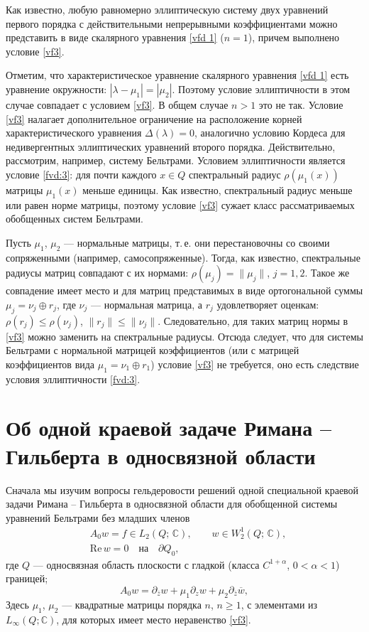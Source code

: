 Как известно, любую равномерно эллиптическую систему двух уравнений первого
порядка с действительными непрерывными коэффициентами можно представить в виде скалярного уравнения \eqref{vfd 1} ($n=1$), причем выполнено условие \eqref{vf3}.

Отметим, что характеристическое уравнение скалярного уравнения
\eqref{vfd 1} есть уравнение окружности: $|\lambda-\mu_1|=|\mu_2|$. Поэтому
условие эллиптичности в этом случае совпадает с условием \eqref{vf3}. В общем
случае $n>1$ это не так.
 Условие \eqref{vf3} налагает
 дополнительное ограничение на расположение
 корней характеристического уравнения $\Delta(\lambda)=0$,
 аналогично условию Кордеса для
 недивергентных эллиптических уравнений
 второго порядка. Действительно,  рассмотрим, например,
 систему Бельтрами. Условием эллиптичности
 является условие \eqref{fvd:3}: для почти каждого $x\in Q$ спектральный радиус $\rho(\mu_1(x))$ матрицы
 $\mu_1(x)$ меньше единицы. Как известно,
 спектральный радиус
 меньше или равен норме матрицы, поэтому условие
 \eqref{vf3} сужает класс рассматриваемых
 обобщенных систем Бельтрами.

Пусть  $\mu_1$, $\mu_2$ --- нормальные матрицы, т.\,е. они перестановочны со своими сопряженными (например, самосопряженные). Тогда, как известно, спектральные радиусы
матриц совпадают с их нормами: $\rho(\mu_j)=\|\mu_j\|$, $j=1,2$.
Такое же совпадение имеет место и для матриц представимых в виде ортогональной суммы $\mu_j=\nu_j\oplus r_j$, где $\nu_j$ --- нормальная матрица, а $r_j$ удовлетворяет оценкам: $\rho(r_j)\leqslant \rho(\nu_j)$, $\|r_j\|\leqslant\|\nu_j\|$.
Следовательно, для таких матриц нормы в \eqref{vf3} можно заменить на спектральные радиусы. Отсюда следует, что для системы Бельтрами с нормальной матрицей коэффициентов
(или с матрицей коэффициентов вида $\mu_1=\nu_1\oplus r_1$) условие  \eqref{vf3} не требуется, оно есть следствие условия эллиптичности \eqref{fvd:3}.


\section{Об одной краевой задаче Римана -- Гильберта  в односвязной области}\label{P1}

Сначала мы изучим вопросы гельдеровости решений одной специальной
краевой задачи Римана -- Гильберта в односвязной области  для обобщенной системы
уравнений Бельтрами без младших членов %
\begin{align}\label{fd 1}
 &A_0w =f\in L_2(Q;\,\mathbb C),\qquad
w\in W^1_2(Q;\,\mathbb C), \\\label{fd 2}
 &\text{Re}\,w=0 \quad \text{на} \quad {\partial Q}_0,
\end{align}
где $Q$ --- односвязная область плоскости с гладкой (класса $C^{1+\alpha}$,
$0<\alpha<1$) границей;
\begin{equation*}
\nonumber  A_0w =\partial_{\bar z}w+\mu_1\partial_{z}w+\mu_2 \partial_{\bar z}\overline w,
\end{equation*}
Здесь $\mu_1$, $\mu_2$ --- квадратные матрицы порядка $n$, $n\geqslant 1$, с элементами из  $L_{\infty}(Q;{\mathbb C})$, для которых
имеет место неравенство \eqref{vf3}.

